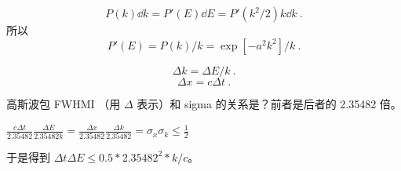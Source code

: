
\begin{equation}
P(k)\dd{k} = P'(E)\dd{E} = P'(k^2/2)k\dd{k}~.
\end{equation}
所以
\begin{equation}
P'(E) = P(k)/k = \exp[-a^2 k^2]/k~.
\end{equation}

\begin{equation}
\Delta k = \Delta E/k~.
\end{equation}
\begin{equation}
\Delta x = c\Delta t~.
\end{equation}


高斯波包 FWHMI （用 $\Delta$ 表示）和 sigma 的关系是？前者是后者的 2.35482 倍。

$\frac{c\Delta t}{2.35482}\frac{\Delta E}{2.35482 k} = \frac{\Delta x}{2.35482}\frac{\Delta k}{2.35482} = \sigma_x \sigma_k \leq \frac{1}{2}$

于是得到 $\Delta t\Delta E \leq 0.5 * 2.35482^2 * k/c$。